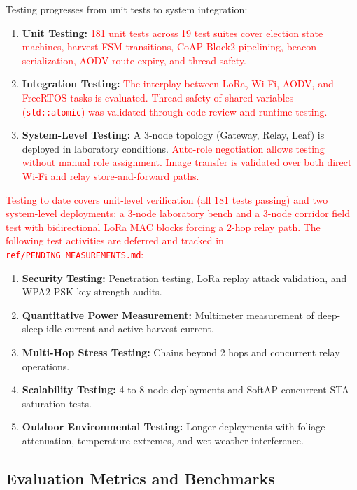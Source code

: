 \documentclass[12pt,a4paper]{article}
\DeclareRobustCommand{\changed}[1]{\textcolor{red}{#1}}
\begin{document}
Testing progresses from unit tests to system integration:

\begin{enumerate}
    \item \textbf{Unit Testing:} \changed{181 unit tests across 19 test suites cover election state machines, harvest FSM transitions, CoAP Block2 pipelining, beacon serialization, AODV route expiry, and thread safety.}

    \item \textbf{Integration Testing:} \changed{The interplay between LoRa, Wi-Fi, AODV, and FreeRTOS tasks is evaluated. Thread-safety of shared variables (\texttt{std::atomic}) was validated through code review and runtime testing.}

    \item \textbf{System-Level Testing:} A 3-node topology (Gateway, Relay, Leaf) is deployed in laboratory conditions. \changed{Auto-role negotiation allows testing without manual role assignment. Image transfer is validated over both direct Wi-Fi and relay store-and-forward paths.}
\end{enumerate}

\changed{Testing to date covers unit-level verification (all 181 tests passing) and two system-level deployments: a 3-node laboratory bench and a 3-node corridor field test with bidirectional LoRa MAC blocks forcing a 2-hop relay path. The following test activities are deferred and tracked in \texttt{ref/PENDING\_MEASUREMENTS.md}:}

\begin{enumerate}
    \item \textbf{Security Testing:} Penetration testing, LoRa replay attack validation, and WPA2-PSK key strength audits.
    \item \textbf{Quantitative Power Measurement:} Multimeter measurement of deep-sleep idle current and active harvest current.
    \item \textbf{Multi-Hop Stress Testing:} Chains beyond 2 hops and concurrent relay operations.
    \item \textbf{Scalability Testing:} 4-to-8-node deployments and SoftAP concurrent STA saturation tests.
    \item \textbf{Outdoor Environmental Testing:} Longer deployments with foliage attenuation, temperature extremes, and wet-weather interference.
\end{enumerate}

\subsection{Evaluation Metrics and Benchmarks}
\end{document}
